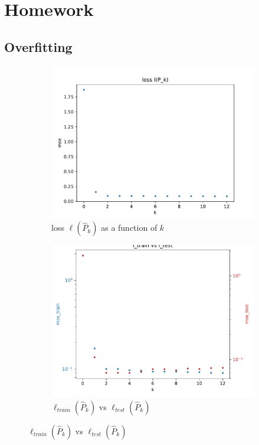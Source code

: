 \documentclass[12pt]{article}
\begin{document}
\section{Homework}

\subsection{Overfitting}
\begin{figure}[htbp]
    \centering
    \begin{subfigure}[t]{0.6\textwidth}
        \centering
        \includegraphics[width=\textwidth]{Homework1/ex1a.pdf}
        \caption{loss \(\ell(\hat{P}_k)\) as a function of \(k\)}
    \end{subfigure}\vspace{10pt}
    \begin{subfigure}[t]{0.6\textwidth}
        \centering
        \includegraphics[width=\textwidth]{Homework1/ex1b.pdf}
        \caption{\(\ell_{train}(\hat{P}_k)\) vs \(\ell_{test}(\hat{P}_k)\)}
    \end{subfigure}
\end{figure}
\end{document}
